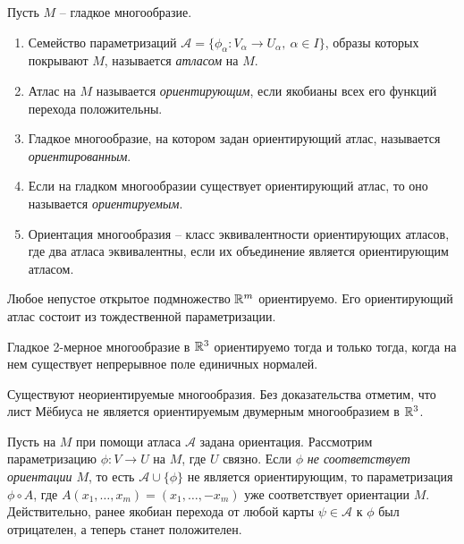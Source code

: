 \begin{definition}
    Пусть $M$ -- гладкое многообразие.
    \begin{enumerate}[itemsep = 0pt, topsep = 5pt]
		\item Семейство параметризаций $\mathcal{A} = \{\phi_\alpha: V_\alpha \to U_\alpha, \ \alpha \in I\}$, образы которых покрывают $M$, называется \textit{атласом} на $M$.
		\item Атлас на $M$ называется \textit{ориентирующим}, если якобианы всех его функций перехода положительны.
		\item Гладкое многообразие, на котором задан ориентирующий атлас, называется \textit{ориентированным}.
		\item Если на гладком многообразии существует ориентирующий атлас, то оно называется \textit{ориентируемым}.
		\item Ориентация многообразия -- класс эквивалентности ориентирующих атласов, где два атласа эквивалентны, если их объединение является ориентирующим атласом.
	\end{enumerate}
\end{definition}

\begin{example}
    Любое непустое открытое подмножество $\mathbb{R}^m$ ориентируемо. Его ориентирующий атлас состоит из тождественной параметризации.
\end{example}

\begin{problem}
    Гладкое 2-мерное многообразие в $\mathbb{R}^3$ ориентируемо тогда и только тогда, когда на нем существует непрерывное поле единичных нормалей.
\end{problem}

\begin{note}
	Существуют неориентируемые многообразия. 
	Без доказательства отметим, что лист Мёбиуса не является ориентируемым двумерным многообразием в $\mathbb{R}^3$.
\end{note}

\begin{note}
    Пусть на $M$ при помощи атласа $\mathcal{A}$ задана ориентация.
	Рассмотрим параметризацию $\phi: V \to U$ на $M$, где $U$ связно.
	Если $\phi$ \textit{не соответствует ориентации $M$}, то есть $\mathcal{A} \cup \{\phi\}$ не является ориентирующим, то параметризация $\phi \circ A$, где $A(x_1, \dotsc, x_m) = (x_1, \dotsc, -x_m)$ уже соответствует ориентации $M$.
	Действительно, ранее якобиан перехода от любой карты $\psi \in \mathcal{A}$ к $\phi$ был отрицателен, а теперь станет положителен. 
\end{note}

